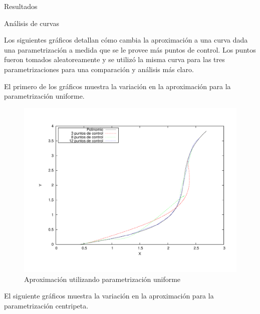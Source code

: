 \begin{section}{Resultados}
\begin{subsection}{Análisis de curvas}
		\VSP

		Los siguientes gráficos detallan cómo cambia la aproximación a una curva dada una parametrización a medida que se le provee más puntos de control. 
		Los puntos fueron tomados aleatoreamente y se utilizó la misma curva para las tres parametrizaciones para una comparación y análisis más claro.
			
		El primero de los gráficos muestra la variación en la aproximación para la parametrización uniforme.
			
		\begin{figure}[H]
		  \centering
			\includegraphics[width=14cm]{graficos/uniform_grafiquinSame.pdf}
		  \caption{Aproximación utilizando parametrización uniforme}
		  \label{fig:uniform}
		\end{figure}
		
		\VSP
		
		El siguiente gráficos muestra la variación en la aproximación para la parametrización centripeta.
		

\end{subsection}
\end{section}
